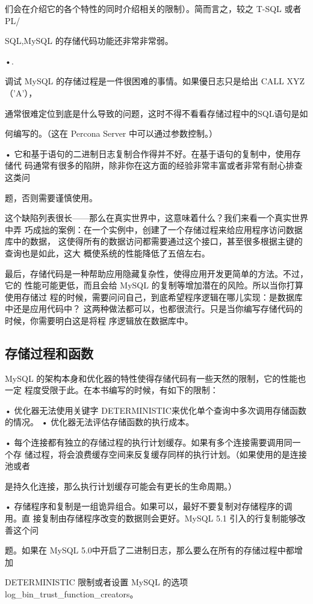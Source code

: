 们会在介绍它的各个特性的同时介绍相关的限制）。简而言之，较之 T-SQL 或者PL/

SQL,MySQL 的存储代码功能还非常非常弱。

•.

调试 MySQL 的存储过程是一件很困难的事情。如果優日志只是给出 CALL XYZ（'A'），

通常很难定位到底是什么导致的问题，这时不得不看看存储过程中的SQL语句是如

何编写的。（这在 Percona Server 中可以通过参数控制。）

• 它和基于语句的二进制日志复制合作得并不好。在基于语句的复制中，使用存储代
码通常有很多的陷阱，除非你在这方面的经验非常丰富或者非常有耐心排查这类问

题，否则需要谨慎使用。

这个缺陷列表很长——那么在真实世界中，这意味着什么？我们来看一个真实世界中弄
巧成拙的案例：在一个实例中，创建了一个存储过程来给应用程序访问数据库中的数据，
这使得所有的数据访问都需要通过这个接口，甚至很多根据主键的查询也是如此，这大
概使系统的性能降低了五倍左右。

最后，存储代码是一种帮助应用隐藏复杂性，使得应用开发更简单的方法。不过，它的
性能可能更低，而且会给 MySQL 的复制等增加潜在的风险。所以当你打算使用存储过
程的时候，需要问问自己，到底希望程序逻辑在哪儿实现：是数据库中还是应用代码中？
这两种做法都可以，也都很流行。只是当你编写存储代码的时候，你需要明白这是将程
序逻辑放在数据库中。

\subsection{存储过程和函数}
MySQL 的架构本身和优化器的特性使得存储代码有一些天然的限制，它的性能也一定
程度受限于此。在本书编写的时候，有如下的限制：

• 优化器无法使用关键字 DETERMINISTIC来优化单个查询中多次调用存储函数的情况。
• 优化器无法评估存储函数的执行成本。

• 每个连接都有独立的存储过程的执行计划缓存。如果有多个连接需要调用同一个存
储过程，将会浪费缓存空间来反复缓存同样的执行计划。（如果使用的是连接池或者

是持久化连接，那么执行计划缓存可能会有更长的生命周期。）

• 存储程序和复制是一组诡异组合。如果可以，最好不要复制对存储程序的调用。直
接复制由存储程序改变的数据则会更好。MySQL 5.1 引入的行复制能够改善这个问

题。如果在 MySQL 5.0中开启了二进制日志，那么要么在所有的存储过程中都增加

DETERMINISTIC 限制或者设置 MySQL 的选项 log\_bin\_trust\_function\_creators。

